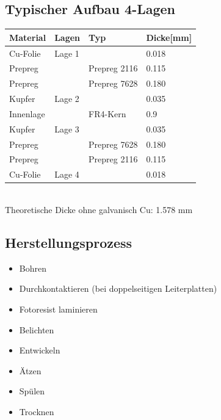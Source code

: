 \subsection{Typischer Aufbau 4-Lagen}
\begin{tabular}{|l|l|l|l|}
\hline
Material&Lagen&Typ&Dicke[mm]\\
\hline
Cu-Folie&Lage 1&&0.018\\
\hline
Prepreg&&Prepreg 2116&0.115\\
\hline
Prepreg&&Prepreg 7628&0.180\\
\hline
Kupfer&Lage 2&&0.035\\
\hline
Innenlage&&FR4-Kern&0.9\\
\hline
Kupfer&Lage 3&&0.035\\
\hline
Prepreg&&Prepreg 7628&0.180\\
\hline
Prepreg&&Prepreg 2116&0.115\\
\hline
Cu-Folie&Lage 4&&0.018\\
\hline
\end{tabular}
\\
Theoretische Dicke ohne galvanisch Cu: 1.578 mm

\subsection{Herstellungsprozess}
\begin{itemize}
  \item Bohren
  \item Durchkontaktieren (bei doppelseitigen Leiterplatten)
  \item Fotoresist laminieren
  \item Belichten
  \item Entwickeln
  \item Ätzen
  \item Spülen 
  \item Trocknen
\end{itemize}
